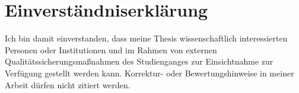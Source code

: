 	\clearpage{\pagestyle{empty}\cleardoublepage}
%
%
%
	\clearpage{\pagestyle{empty}\cleardoublepage}%
%
%
%
%
%
%
%
	\clearpage{\pagestyle{empty}}%
%
%
%
	\vspace*{2em}%
	\section*{Einverständniserklärung}
	\noindent Ich bin damit einverstanden, dass meine Thesis wissenschaftlich interessierten Personen oder Institutionen und im Rahmen von externen Qualitätssicherungsmaßnahmen des Studienganges zur Einsichtnahme zur Verfügung gestellt werden kann. Korrektur- oder Bewertungshinweise in meiner Arbeit dürfen nicht zitiert werden.
	
